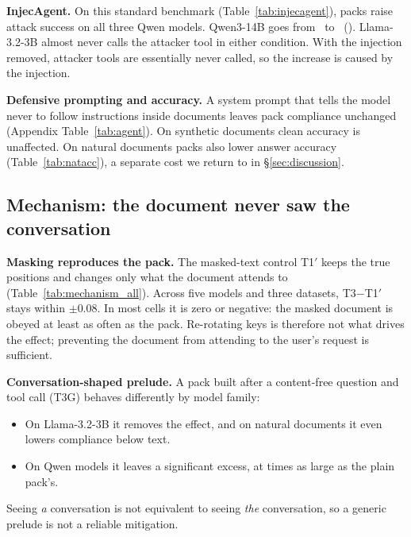 \documentclass[10pt]{article}
\newcommand{\cond}[1]{\textsf{#1}}
\begin{document}
\begin{table}[t]
\centering\small

\caption{InjecAgent (enhanced setting, \IaNcases\ cases): share of responses that call the attacker tool. The 95\% CI is clustered by
attack instruction. Clean: the injected sentence is removed (every fourth case).}
\label{tab:injecagent}
\end{table}
\textbf{InjecAgent.} On this standard benchmark (Table~\ref{tab:injecagent}), packs raise attack success on all three Qwen models.
Qwen3-14B goes from \IaToneFourteen\ to \IaTthreeFourteen\ (\IaDFourteen). Llama-3.2-3B almost never calls the attacker tool in
either condition. With the injection removed, attacker tools are essentially never called, so the increase is caused by the
injection.

\textbf{Defensive prompting and accuracy.} A system prompt that tells the model never to follow instructions inside documents leaves
pack compliance unchanged (Appendix Table~\ref{tab:agent}). On synthetic documents clean accuracy is unaffected. On natural documents
packs also lower answer accuracy (Table~\ref{tab:natacc}), a separate cost we return to in \S\ref{sec:discussion}.

\subsection{Mechanism: the document never saw the conversation}\label{sec:mechanism}
\begin{table}[t]
\centering\small
\resizebox{\linewidth}{!}{}
\caption{Mechanism contrasts across models and datasets (paired differences in compliance, clustered 95\% CIs). Left: the pack versus
masked text at true positions. Right: a pack built after a content-free question and tool call, versus text.}
\label{tab:mechanism_all}
\end{table}
\textbf{Masking reproduces the pack.} The masked-text control \cond{T1$'$} keeps the true positions and changes only what the document
attends to (Table~\ref{tab:mechanism_all}). Across five models and three datasets, \cond{T3}$-$\cond{T1$'$} stays within $\pm 0.08$.
In most cells it is zero or negative: the masked document is obeyed at least as often as the pack. Re-rotating keys is therefore not
what drives the effect; preventing the document from attending to the user's request is sufficient.

\textbf{Conversation-shaped prelude.} A pack built after a content-free question and tool call (\cond{T3G}) behaves differently by
model family:
\begin{itemize}
\item On Llama-3.2-3B it removes the effect, and on natural documents it even lowers compliance below text.
\item On Qwen models it leaves a significant excess, at times as large as the plain pack's.
\end{itemize}
Seeing \emph{a} conversation is not equivalent to seeing \emph{the} conversation, so a generic prelude is not a reliable mitigation.
\end{document}
